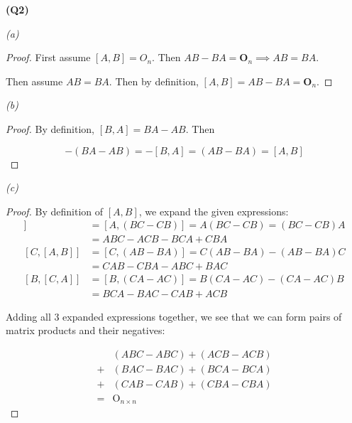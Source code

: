 \documentclass[12pt, a4paper]{article}
\newcommand{\Om}{\operatorname{O}}
\begin{document}
\textbf{(Q2)}

\textit{(a)}
\begin{proof}
    First assume $[A, B] = O_n$. Then $AB - BA = \textbf{O}_n \implies AB = BA$.

    Then assume $AB = BA$. Then by definition, $[A, B] = AB - BA = \textbf{O}_n$.
\end{proof}

\textit{(b)}
\begin{proof}
    By definition, $[B, A] = BA - AB$. Then

    \[
        -(BA - AB) = -[B, A] = (AB - BA) = [A, B]
    \]
\end{proof}

\textit{(c)}
\begin{proof}
    By definition of $[A, B]$, we expand the given expressions:
    \begin{align*}
        [A, [B, C]] & = [A, (BC - CB)] = A(BC - CB) = (BC - CB)A\\
        & = ABC - ACB - BCA + CBA\\
        [C, [A, B]] & = [C, (AB - BA)] = C(AB - BA) - (AB - BA)C\\
        & = CAB - CBA - ABC + BAC\\
        [B, [C, A]] & = [B, (CA - AC)] = B(CA - AC) - (CA - AC)B\\
        & = BCA - BAC - CAB + ACB
    \end{align*}

    Adding all 3 expanded expressions together, we see that we can
    form pairs of matrix products and their negatives:

    \begin{align*}
          & (ABC - ABC) + (ACB - ACB)\\
        + & (BAC - BAC) + (BCA - BCA)\\
        + & (CAB - CAB) + (CBA - CBA)\\
        = & \Om_{n \times n}
    \end{align*}
\end{proof}
\end{document}
